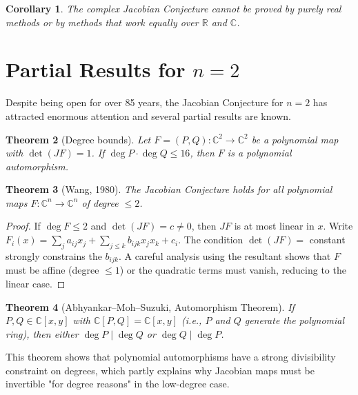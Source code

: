 \documentclass[12pt,a4paper]{amsart}
\newtheorem{theorem}{Theorem}[section]
\newtheorem{corollary}[theorem]{Corollary}
\theoremstyle{definition}
\theoremstyle{remark}
\begin{document}
\begin{corollary}
The complex Jacobian Conjecture cannot be proved by purely real methods or by
methods that work equally over $\mathbb{R}$ and $\mathbb{C}$.
\end{corollary}

\section{Partial Results for \texorpdfstring{$n=2$}{n=2}}
\label{sec:n2}

Despite being open for over 85 years, the Jacobian Conjecture for $n = 2$ has
attracted enormous attention and several partial results are known.

\begin{theorem}[Degree bounds]\label{thm:degbound}
Let $F = (P, Q) \colon \mathbb{C}^2 \to \mathbb{C}^2$ be a polynomial map with
$\det(JF) = 1$. If $\deg P \cdot \deg Q \leq 16$, then $F$ is a polynomial
automorphism.
\end{theorem}

\begin{theorem}[Wang, 1980]\label{thm:wang}
The Jacobian Conjecture holds for all polynomial maps $F \colon \mathbb{C}^n \to \mathbb{C}^n$
of degree $\leq 2$.
\end{theorem}

\begin{proof}
If $\deg F \leq 2$ and $\det(JF) = c \neq 0$, then $JF$ is at most linear in $x$.
Write $F_i(x) = \sum_j a_{ij} x_j + \sum_{j \leq k} b_{ijk} x_j x_k + c_i$.
The condition $\det(JF) = $ constant strongly constrains the $b_{ijk}$. A
careful analysis using the resultant shows that $F$ must be affine (degree $\leq 1$)
or the quadratic terms must vanish, reducing to the linear case.
\end{proof}

\begin{theorem}[Abhyankar--Moh--Suzuki, Automorphism Theorem]\label{thm:AMS}
If $P, Q \in \mathbb{C}[x,y]$ with $\mathbb{C}[P,Q] = \mathbb{C}[x,y]$ (i.e., $P$ and $Q$
generate the polynomial ring), then either $\deg P \mid \deg Q$ or $\deg Q \mid \deg P$.
\end{theorem}

This theorem shows that polynomial automorphisms have a strong divisibility
constraint on degrees, which partly explains why Jacobian maps must be invertible
"for degree reasons" in the low-degree case.
\end{document}
